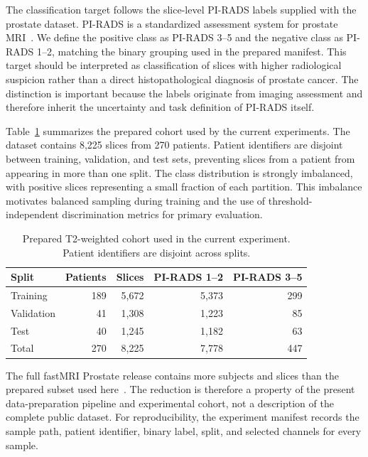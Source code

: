 \documentclass[journal]{IEEEtran}
\begin{document}
The classification target follows the slice-level PI-RADS labels supplied with the prostate dataset. PI-RADS is a standardized assessment system for prostate MRI~\cite{Turkbey2019PIRADSv21}. We define the positive class as PI-RADS 3--5 and the negative class as PI-RADS 1--2, matching the binary grouping used in the prepared manifest. This target should be interpreted as classification of slices with higher radiological suspicion rather than a direct histopathological diagnosis of prostate cancer. The distinction is important because the labels originate from imaging assessment and therefore inherit the uncertainty and task definition of PI-RADS itself.

Table~\ref{tab:cohort} summarizes the prepared cohort used by the current experiments. The dataset contains 8,225 slices from 270 patients. Patient identifiers are disjoint between training, validation, and test sets, preventing slices from a patient from appearing in more than one split. The class distribution is strongly imbalanced, with positive slices representing a small fraction of each partition. This imbalance motivates balanced sampling during training and the use of threshold-independent discrimination metrics for primary evaluation.

\begin{table}[t]
\centering
\caption{Prepared T2-weighted cohort used in the current experiment. Patient identifiers are disjoint across splits.}
\label{tab:cohort}
\scriptsize
\begin{tabular}{lrrrr}
\toprule
Split & Patients & Slices & PI-RADS 1--2 & PI-RADS 3--5 \\
\midrule
Training   & 189 & 5,672 & 5,373 & 299 \\
Validation & 41  & 1,308 & 1,223 & 85 \\
Test       & 40  & 1,245 & 1,182 & 63 \\
\midrule
Total      & 270 & 8,225 & 7,778 & 447 \\
\bottomrule
\end{tabular}
\end{table}

The full fastMRI Prostate release contains more subjects and slices than the prepared subset used here~\cite{Tibrewala2024FastMRIProstate}. The reduction is therefore a property of the present data-preparation pipeline and experimental cohort, not a description of the complete public dataset. For reproducibility, the experiment manifest records the sample path, patient identifier, binary label, split, and selected channels for every sample.
\end{document}
